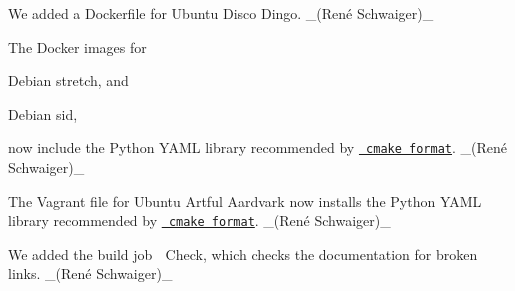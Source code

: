 \begin{DoxyItemize}
\item We added a Dockerfile for Ubuntu Disco Dingo. \+\_\+(René Schwaiger)\+\_\+
\end{DoxyItemize}


\begin{DoxyItemize}
\item The Docker images for
\begin{DoxyItemize}
\item Debian stretch, and
\item Debian sid,
\end{DoxyItemize}

now include the Python Y\+A\+ML library recommended by \href{https://github.com/cheshirekow/cmake_format}{\texttt{ cmake format}}. \+\_\+(René Schwaiger)\+\_\+
\end{DoxyItemize}


\begin{DoxyItemize}
\item The Vagrant file for Ubuntu Artful Aardvark now installs the Python Y\+A\+ML library recommended by \href{https://github.com/cheshirekow/cmake_format}{\texttt{ cmake format}}. \+\_\+(René Schwaiger)\+\_\+
\end{DoxyItemize}


\begin{DoxyItemize}
\item We added the build job {\ttfamily 🔗 Check}, which checks the documentation for broken links. \+\_\+(René Schwaiger)\+\_\+
\end{DoxyItemize}


